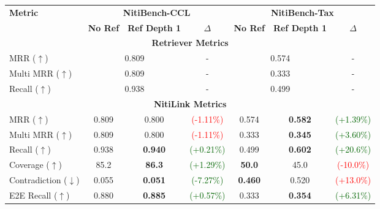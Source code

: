 \begin{table}[!ht]
\centering
\renewcommand{\arraystretch}{1.3}
\newcommand{\gray}{\cellcolor{gray!15}}
\newcommand{\pos}[1]{\textcolor{darkgreen}{(#1\%)}}
\newcommand{\negv}[1]{\textcolor{red}{(#1\%)}}

\begin{tabular}{lcccccc}
\toprule
\multirow{2}{*}{\textbf{Metric}} & \multicolumn{3}{c}{\textbf{NitiBench-CCL}} & \multicolumn{3}{c}{\textbf{NitiBench-Tax}} \\ 
 & \textbf{No Ref} & \gray \textbf{Ref Depth 1} & $\Delta$ & \textbf{No Ref} & \gray \textbf{Ref Depth 1} & $\Delta$ \\ 
\midrule
\multicolumn{7}{c}{\textbf{Retriever Metrics}} \\ 
\midrule
MRR ($\uparrow$)       & \multicolumn{2}{c}{0.809} & -  & \multicolumn{2}{c}{0.574} & -  \\
Multi MRR ($\uparrow$) & \multicolumn{2}{c}{0.809} & -  & \multicolumn{2}{c}{0.333} & -  \\
Recall ($\uparrow$)    & \multicolumn{2}{c}{0.938} & -  & \multicolumn{2}{c}{0.499} & -  \\
\midrule
\multicolumn{7}{c}{\textbf{NitiLink Metrics}} \\ 
\midrule
MRR ($\uparrow$)             & 0.809  & \gray 0.800  & \negv{-1.11}  & 0.574  & \gray \textbf{0.582}  & \pos{+1.39}  \\
Multi MRR ($\uparrow$)       & 0.809  & \gray 0.800  & \negv{-1.11}  & 0.333  & \gray \textbf{0.345}  & \pos{+3.60}  \\
Recall ($\uparrow$)          & 0.938  & \gray \textbf{0.940}  & \pos{+0.21}  & 0.499  & \gray \textbf{0.602}  & \pos{+20.6}  \\
Coverage ($\uparrow$)        & 85.2   & \gray \textbf{86.3}  & \pos{+1.29}  & \textbf{50.0}   & \gray 45.0   & \negv{-10.0}  \\
Contradiction ($\downarrow$) & 0.055  & \gray \textbf{0.051}  & \pos{-7.27}  & \textbf{0.460}  & \gray 0.520  & \negv{+13.0}  \\
E2E Recall ($\uparrow$)      & 0.880  & \gray \textbf{0.885}  & \pos{+0.57}  & 0.333  & \gray \textbf{0.354}  & \pos{+6.31}  \\

\end{tabular}
\end{table}
